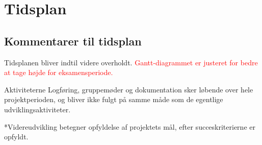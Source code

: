 \section{Tidsplan}

\clearpage
\subsection{Kommentarer til tidsplan}

Tidsplanen bliver indtil videre overholdt. \textcolor{red}{Gantt-diagrammet er justeret for bedre at tage højde for eksamensperiode.}

Aktiviteterne Logføring, gruppemøder og dokumentation sker løbende over hele projektperioden, og bliver ikke fulgt på samme måde som de egentlige udviklingsaktiviteter.

*Videreudvikling betegner opfyldelse af projektets mål, efter succeskriterierne er opfyldt.